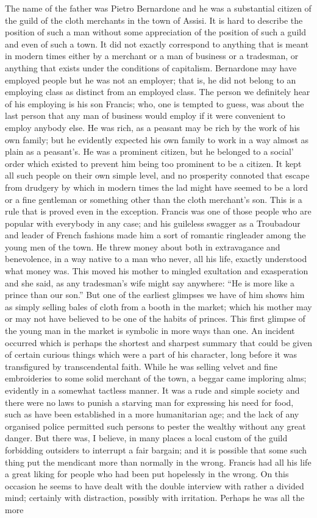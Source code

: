 \documentclass{book}
\begin{document}
The name of the father was Pietro Bernardone and he was a substantial citizen of the guild of the cloth merchants in the town of Assisi. It is hard to describe the position of such a man without some appreciation of the position of such a guild and even of such a town. It did not exactly correspond to anything that is meant in modern times either by a merchant or a man of business or a tradesman, or anything that exists under the conditions of capitalism. Bernardone may have employed people but he was not an employer; that is, he did not belong to an employing class as distinct from an employed class. The person we definitely hear of his employing is his son Francis; who, one is tempted to guess, was about the last person that any man of business would employ if it were convenient to employ anybody else. He was rich, as a peasant may be rich by the work of his own family; but he evidently expected his own family to work in a way almost as plain as a peasant’s. He was a prominent citizen, but he belonged to a social’ order which existed to prevent him being too prominent to be a citizen. It kept all such people on their own simple level, and no prosperity connoted that escape from drudgery by which in modern times the lad might have seemed to be a lord or a fine gentleman or something other than the cloth merchant’s son. This is a rule that is proved even in the exception. Francis was one of those people who are popular with everybody in any case; and his guileless swagger as a Troubadour and leader of French fashions made him a sort of romantic ringleader among the young men of the town. He threw money about both in extravagance and benevolence, in a way native to a man who never, all his life, exactly understood what money was. This moved his mother to mingled exultation and exasperation and she said, as any tradesman’s wife might say anywhere: “He is more like a prince than our son.” But one of the earliest glimpses we have of him shows him as simply selling bales of cloth from a booth in the market; which his mother may or may not have believed to be one of the habits of princes. This first glimpse of the young man in the market is symbolic in more ways than one. An incident occurred which is perhaps the shortest and sharpest summary that could be given of certain curious things which were a part of his character, long before it was transfigured by transcendental faith. While he was selling velvet and fine embroideries to some solid merchant of the town, a beggar came imploring alms; evidently in a somewhat tactless manner. It was a rude and simple society and there were no laws to punish a starving man for expressing his need for food, such as have been established in a more humanitarian age; and the lack of any organised police permitted such persons to pester the wealthy without any great danger. But there was, I believe, in many places a local custom of the guild forbidding outsiders to interrupt a fair bargain; and it is possible that some such thing put the mendicant more than normally in the wrong. Francis had all his life a great liking for people who had been put hopelessly in the wrong. On this occasion he seems to have dealt with the double interview with rather a divided mind; certainly with distraction, possibly with irritation. Perhaps he was all the more 
\end{document}
